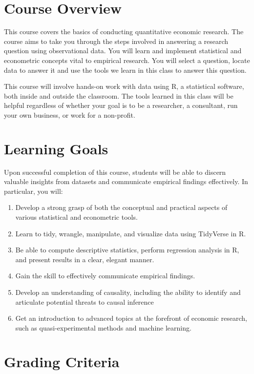 \documentclass{syllabus}
\begin{document}
\section*{Course Overview}
This course covers the basics of conducting quantitative economic research. The course aims to take you through the steps involved in answering a research question using observational data. You will learn and implement statistical and econometric concepts vital to empirical research. You will select a question, locate data to answer it and use the tools we learn in this class to answer this question.

This course will involve hands-on work with data using $\mathrm{R}$, a statistical software, both inside and outside the classroom. The tools learned in this class will be helpful regardless of whether your goal is to be a researcher, a consultant, run your own business, or work for a non-profit.

\section*{Learning Goals}
Upon successful completion of this course, students will be able to discern valuable insights from datasets and communicate empirical findings effectively. In particular, you will:
\begin{enumerate}
\itemsep0em 
  \item Develop a strong grasp of both the conceptual and practical aspects of various statistical and econometric tools.
  \item Learn to tidy, wrangle, manipulate, and visualize data using TidyVerse in $\mathrm{R}$.
  \item Be able to compute descriptive statistics, perform regression analysis in R, and present results in a clear, elegant manner.
  \item Gain the skill to effectively communicate empirical findings.
  \item Develop an understanding of causality, including the ability to identify and articulate potential threats to causal inference
  \item Get an introduction to advanced topics at the forefront of economic research, such as quasi-experimental methods and machine learning.
\end{enumerate}

\newpage
\section*{Grading Criteria}
\end{document}
